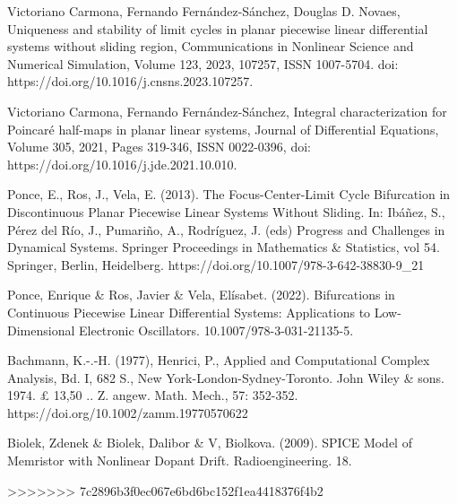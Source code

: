 \documentclass[12pt,a4paper]{report} %
\begin{document}
\begin{thebibliography}{99}
		 Victoriano Carmona, Fernando Fernández-Sánchez, Douglas D. Novaes,
		Uniqueness and stability of limit cycles in planar piecewise linear differential systems without sliding region,
		Communications in Nonlinear Science and Numerical Simulation,
		Volume 123, 2023, 107257, ISSN 1007-5704.
		doi: https://doi.org/10.1016/j.cnsns.2023.107257.
		
		 Victoriano Carmona, Fernando Fernández-Sánchez,
		Integral characterization for Poincaré half-maps in planar linear systems, Journal of Differential Equations, Volume 305, 2021, Pages 319-346, ISSN 0022-0396, doi: https://doi.org/10.1016/j.jde.2021.10.010.
		
		 Ponce, E., Ros, J., Vela, E. (2013). The Focus-Center-Limit Cycle Bifurcation in Discontinuous Planar Piecewise Linear Systems Without Sliding. In: Ibáñez, S., Pérez del Río, J., Pumariño, A., Rodríguez, J. (eds) Progress and Challenges in Dynamical Systems. Springer Proceedings in Mathematics \& Statistics, vol 54. Springer, Berlin, Heidelberg. https://doi.org/10.1007/978-3-642-38830-9\_21
		
		 Ponce, Enrique \& Ros, Javier \& Vela, Elísabet. (2022). Bifurcations in Continuous Piecewise Linear Differential Systems: Applications to Low-Dimensional Electronic Oscillators. 10.1007/978-3-031-21135-5. 
		
		 Bachmann, K.-.-H. (1977), Henrici, P., Applied and Computational Complex Analysis, Bd. I, 682 S., New York-London-Sydney-Toronto. John Wiley \& sons. 1974. £ 13,50 .. Z. angew. Math. Mech., 57: 352-352. https://doi.org/10.1002/zamm.19770570622
		
		 Biolek, Zdenek \& Biolek, Dalibor \& V, Biolkova. (2009). SPICE Model of Memristor with Nonlinear Dopant Drift. Radioengineering. 18. 
		
	\end{thebibliography}
	
	\newpage
	
>>>>>>> 7c2896b3f0ec067e6bd6bc152f1ea4418376f4b2
\end{document}
